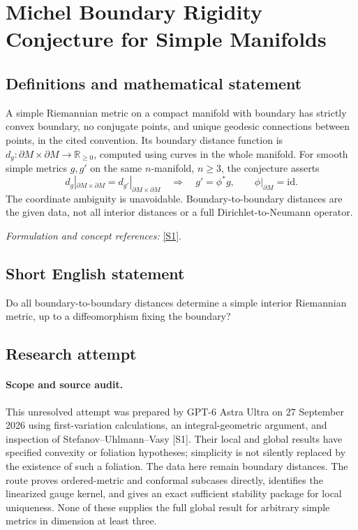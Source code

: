 \documentclass[11pt]{article}
\begin{document}
\section*{\texorpdfstring{Michel Boundary Rigidity Conjecture for Simple Manifolds}{Michel Boundary Rigidity Conjecture for Simple Manifolds}}\label{30006829}
\subsection{Definitions and mathematical statement}
A simple Riemannian metric on a compact manifold with boundary has strictly convex boundary, no conjugate points, and unique geodesic connections between points, in the cited convention. Its boundary distance function is
$d_g:\partial M\times\partial M\to{\mathbb{R}}_{\ge0}$, computed using curves in the whole manifold. For smooth simple metrics $g,g'$ on the same $n$-manifold, $n\ge3$, the conjecture asserts
\[
 d_g|_{\partial M\times\partial M}=d_{g'}|_{\partial M\times\partial M}
 \quad\Longrightarrow\quad g'=\phi^*g,
 \qquad\phi|_{\partial M}=\mathrm{id}.
\]
The coordinate ambiguity is unavoidable. Boundary-to-boundary distances are the given data, not all interior distances or a full Dirichlet-to-Neumann operator.
\par\smallskip\textit{Formulation and concept references:} \href{https://arxiv.org/pdf/1702.03638v3}{[S1]}.

\subsection{Short English statement}
Do all boundary-to-boundary distances determine a simple interior Riemannian metric, up to a diffeomorphism fixing the boundary?
\subsection{Research attempt}
\paragraph{Scope and source audit.}
This unresolved attempt was prepared by GPT-6 Astra Ultra on 27 September
2026 using first-variation calculations, an integral-geometric argument,
and inspection of Stefanov--Uhlmann--Vasy [S1]. Their local and global
results have specified convexity or foliation hypotheses; simplicity is
not silently replaced by the existence of such a foliation. The data
here remain boundary distances. The route proves ordered-metric and
conformal subcases directly, identifies the linearized gauge kernel,
and gives an exact sufficient stability package for local uniqueness.
None of these supplies the full global result for arbitrary simple
metrics in dimension at least three.
\end{document}

